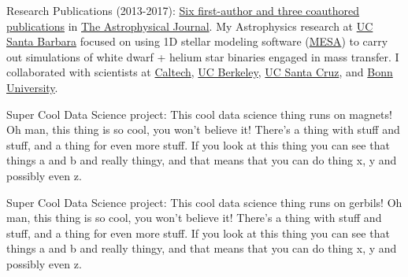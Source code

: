 \documentclass[10pt]{article} %
\begin{document}
\jobb
{Research Publications (2013-2017):}
{\href{http://adsabs.harvard.edu/cgi-bin/nph-abs_connect?library&libname=MyPapers&libid=561872b258}{Six first-author and three coauthored publications} in \href{http://iopscience.iop.org/journal/0004-637X}{The Astrophysical Journal}.}
{My Astrophysics research at \href{http://www.ucsb.edu}{UC Santa Barbara} focused on using 1D stellar modeling software (\href{http://mesa.sourceforge.net/}{MESA}) to carry out simulations of white dwarf + helium star binaries engaged in mass transfer. I collaborated with scientists at \href{https://www.caltech.edu/}{Caltech}, \href{www.berkeley.edu/}{UC Berkeley}, \href{https://www.ucsc.edu}{UC Santa Cruz}, and \href{https://www.uni-bonn.de/}{Bonn University}.}%


\jobb
{Super Cool Data Science project:}
{This cool data science thing runs on magnets!}
{Oh man, this thing is so cool, you won't believe it! There's a thing with stuff and stuff, and a thing for even more stuff. If you look at this thing you can see that things a and b and really thingy, and that means that you can do thing x, y and possibly even z.}



\jobb
{Super Cool Data Science project:}
{This cool data science thing runs on gerbils!}
{Oh man, this thing is so cool, you won't believe it! There's a thing with stuff and stuff, and a thing for even more stuff. If you look at this thing you can see that things a and b and really thingy, and that means that you can do thing x, y and possibly even z.}

\end{document}
